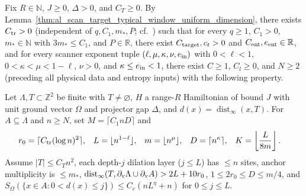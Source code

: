 \begin{lemma}
    \label{thm:arealaw-source-charge-selection}
    \leanok
    Fix $R\in\mathbb N$, $J\geq0$, $\Delta>0$, and
    $C_T\geq0$. By Lemma~\ref{thm:al_scan_target_typical_window_uniform_dimension}, there exists $C_{\rm tr}>0$ (independent of $q,C_1,m_*,P$; cf.\ \cite[Proposition~4.5 and Section~9, lines~49--59]{OpenAI2026AreaLaw}) such that for every
    $q\geq1$, $C_1>0$, $m_*\in\mathbb N$ with $3m_*\leq C_1$, and $P\in\mathbb R$, there
    exist $C_{\rm target},c_t>0$ and $C_{\rm ent},e_{\rm ent}\in\mathbb R$, and for every scanner exponent tuple $(\ell,\mu,\kappa,\nu,e_{\rm in})$ with
    $0<\ell<1$, $0<\kappa<\mu<1-\ell$, $\nu>0$, and $\kappa\le e_{\rm in}<1$, there exist
    $C\geq1$, $C_l\geq0$, and $N\geq2$ (preceding all physical data and entropy inputs) with the following property.

    Let $\Lambda,T\subset\mathbb Z^2$ be finite with $T\ne\varnothing$,
    $H$ a range-$R$ Hamiltonian of bound $J$ with unit ground vector $\Omega$ and projector gap
    $\Delta$, and $d(x)=\operatorname{dist}_\infty(x,T)$.
    For $A\subseteq\Lambda$ and $n\geq N$, set $M=\lceil C_1nD\rceil$ and
    \begin{align}
        r_0 & =\lceil C_{\rm tr}(\log n)^2\rceil,     &
        L   & =\lfloor n^{1-\ell}\rfloor,             &
        m   & =\lfloor n^\mu\rfloor,                  &
        D   & =\lceil n^\kappa\rceil,                 &
        K   & =\left\lfloor\frac{L}{8m}\right\rfloor.
        \label{eq:arealaw-scanner-scales}
    \end{align}
    Assume $|T|\leq C_Tn^2$, each depth-$j$ dilation layer ($j\le L$) has $\le n$ sites,
    anchor multiplicity is $\le m_*$, $\operatorname{dist}_\infty(T,\partial_{\rm v}\Lambda\cup\partial_{\rm v}A)>2L+10r_0$,
    $1\le 2r_0\le D\le m/4$, and
    $S_\Omega(\{x\in A:0<d(x)\leq j\})\leq C_e(nL^\eta+n)$ for $0\leq j\leq L$.


\end{lemma}

